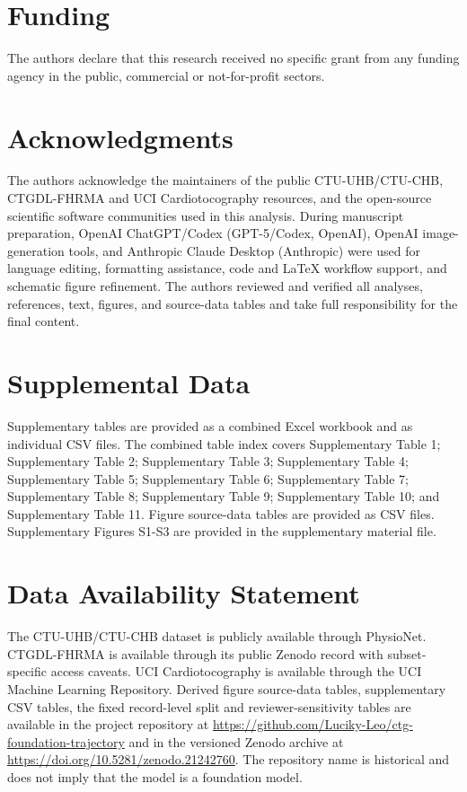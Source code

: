 \documentclass[utf8]{FrontiersinHarvard}
\begin{document}
        \section*{Funding}
        The authors declare that this research received no specific grant from any funding agency in the public, commercial or not-for-profit sectors.

        \section*{Acknowledgments}
        The authors acknowledge the maintainers of the public CTU-UHB/CTU-CHB, CTGDL-FHRMA and UCI Cardiotocography resources, and the open-source scientific software communities used in this analysis. During manuscript preparation, OpenAI ChatGPT/Codex (GPT-5/Codex, OpenAI), OpenAI image-generation tools, and Anthropic Claude Desktop (Anthropic) were used for language editing, formatting assistance, code and LaTeX workflow support, and schematic figure refinement. The authors reviewed and verified all analyses, references, text, figures, and source-data tables and take full responsibility for the final content.

        \section*{Supplemental Data}
        Supplementary tables are provided as a combined Excel workbook and as individual CSV files. The combined table index covers Supplementary Table 1; Supplementary Table 2; Supplementary Table 3; Supplementary Table 4; Supplementary Table 5; Supplementary Table 6; Supplementary Table 7; Supplementary Table 8; Supplementary Table 9; Supplementary Table 10; and Supplementary Table 11. Figure source-data tables are provided as CSV files. Supplementary Figures S1-S3 are provided in the supplementary material file.

        \section*{Data Availability Statement}
        The CTU-UHB/CTU-CHB dataset is publicly available through PhysioNet. CTGDL-FHRMA is available through its public Zenodo record with subset-specific access caveats. UCI Cardiotocography is available through the UCI Machine Learning Repository. Derived figure source-data tables, supplementary CSV tables, the fixed record-level split and reviewer-sensitivity tables are available in the project repository at \url{https://github.com/Luciky-Leo/ctg-foundation-trajectory} and in the versioned Zenodo archive at \url{https://doi.org/10.5281/zenodo.21242760}. The repository name is historical and does not imply that the model is a foundation model.
\end{document}
